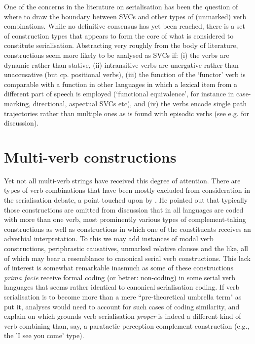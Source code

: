 One of the concerns in the literature on serialisation has been the question of where to draw the boundary between SVCs and other types of (unmarked) verb combinations. While no definitive consensus has yet been reached, there is a set of construction types that appears to form the core of what is considered to constitute serialisation. Abstracting very roughly from the body of literature, constructions seem more likely to be analysed as SVCs if: (i) the verbs are dynamic rather than stative, (ii) intransitive verbs are unergative rather than unaccusative (but cp. positional verbs), (iii) the function of the `functor' verb is comparable with a function in other languages in which a lexical item from a different part of speech is employed (`functional equivalence', for instance in case-marking, directional, aspectual SVCs etc), and (iv) the verbs encode single path trajectories rather than multiple ones as is found with episodic verbs (see e.g. \citealt{pawley2011event} for discussion). 

\section{Multi-verb constructions}

Yet not all multi-verb strings have received this degree of attention. There are types of verb combinations that have been mostly excluded from consideration in the serialisation debate, a point touched upon by \citep{givon1991serial}. He pointed out that typically those constructions are omitted from discussion that in all languages are coded with more than one verb, most prominently various types of complement-taking constructions as well as constructions in which one of the constituents receives an adverbial interpretation. To this we may add instances of modal verb constructions, periphrastic causatives, unmarked relative clauses and the like, all of which may bear a resemblance to canonical serial verb constructions. This lack of interest is somewhat remarkable inasmuch as some of these constructions \emph{prima facie} receive formal coding (or better: non-coding) in some serial verb languages that seems rather identical to canonical serialisation coding. If verb serialisation is to become more than a mere ``pre-theoretical umbrella term" as \citet{zwicky1990we} put it, analyses would need to account for such cases of coding similarity, and explain on which grounds verb serialisation \textit{proper} is indeed a different kind of verb combining than, say, a paratactic perception complement construction (e.g., the 'I see you come' type). 

